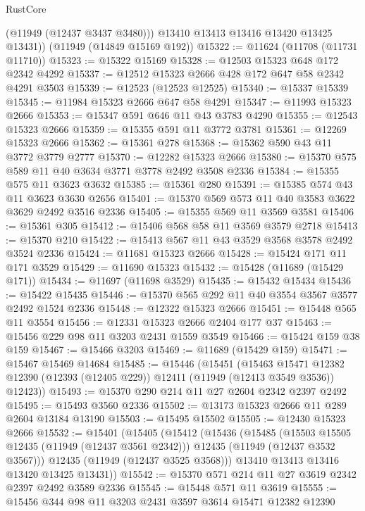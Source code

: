 \begin{lexlean}{RustCore}
\begin{coremodule}
          (@11949 (@12437 @3437 @3480)))
        @13410
        @13413
        @13416
        @13420
        @13425
        @13431))
    (@11949 (@14849 @15169 @192))
@15322 := @11624 (@11708 (@11731 @11710))
@15323 := @15322 @15169
@15328 := @12503 @15323 @648 @172 @2342 @4292
@15337 := @12512 @15323 @2666 @428 @172 @647 @58 @2342 @4291 @3503
@15339 := @12523 (@12523 @12525)
@15340 := @15337 @15339
@15345 := @11984 @15323 @2666 @647 @58 @4291
@15347 := @11993 @15323 @2666
@15353 := @15347 @591 @646 @11 @43 @3783 @4290
@15355 := @12543 @15323 @2666
@15359 := @15355 @591 @11 @3772 @3781
@15361 := @12269 @15323 @2666
@15362 := @15361 @278
@15368 := @15362 @590 @43 @11 @3772 @3779 @2777
@15370 := @12282 @15323 @2666
@15380 := @15370 @575 @589 @11 @40 @3634 @3771 @3778 @2492 @3508 @2336
@15384 := @15355 @575 @11 @3623 @3632
@15385 := @15361 @280
@15391 := @15385 @574 @43 @11 @3623 @3630 @2656
@15401 := @15370 @569 @573 @11 @40 @3583 @3622 @3629 @2492 @3516 @2336
@15405 := @15355 @569 @11 @3569 @3581
@15406 := @15361 @305
@15412 := @15406 @568 @58 @11 @3569 @3579 @2718
@15413 := @15370 @210
@15422 := @15413 @567 @11 @43 @3529 @3568 @3578 @2492 @3524 @2336
@15424 := @11681 @15323 @2666
@15428 := @15424 @171 @11 @171 @3529
@15429 := @11690 @15323
@15432 := @15428 (@11689 (@15429 @171))
@15434 := @11697 (@11698 @3529)
@15435 := @15432 @15434
@15436 := @15422 @15435
@15446 := @15370 @565 @292 @11 @40 @3554 @3567 @3577 @2492 @1524 @2336
@15448 := @12322 @15323 @2666
@15451 := @15448 @565 @11 @3554
@15456 := @12331 @15323 @2666 @2404 @177 @37
@15463 := @15456 @229 @98 @11 @3203 @2431 @1559 @3549
@15466 := @15424 @159 @38 @159
@15467 := @15466 @3203
@15469 := @11689 (@15429 @159)
@15471 := @15467 @15469 @14684
@15485 := @15446
    (@15451
      (@15463
        @15471
        @12382
        @12390
        (@12393 (@12405 @229))
        @12411
        (@11949 (@12413 @3549 @3536))
        @12423))
@15493 := @15370 @290 @214 @11 @27 @2604 @2342 @2397 @2492
@15495 := @15493 @3560 @2336
@15502 := @13173 @15323 @2666 @11 @289 @2604 @13184 @13190
@15503 := @15495 @15502
@15505 := @12430 @15323 @2666
@15532 := @15401
    (@15405
      (@15412
        (@15436
          (@15485
            (@15503 @15505 @12435 (@11949 (@12437 @3561 @2342)))
            @12435
            (@11949 (@12437 @3532 @3567)))
          @12435
          (@11949 (@12437 @3525 @3568)))
        @13410
        @13413
        @13416
        @13420
        @13425
        @13431))
@15542 := @15370 @571 @214 @11 @27 @3619 @2342 @2397 @2492 @3589 @2336
@15545 := @15448 @571 @11 @3619
@15555 := @15456 @344 @98 @11 @3203 @2431 @3597 @3614 @15471 @12382 @12390

\end{coremodule}
\end{lexlean}
